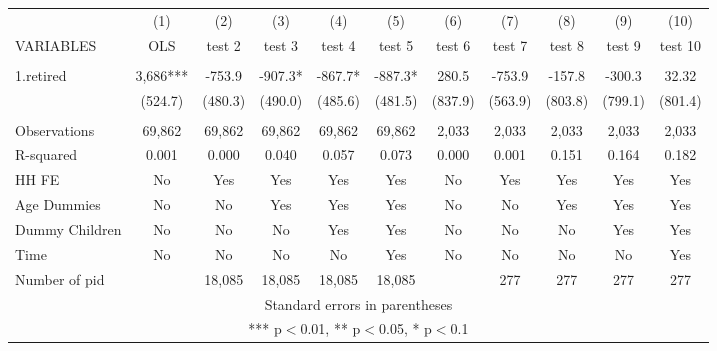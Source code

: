 \begin{tabular}{lcccccccccc} \hline
 & (1) & (2) & (3) & (4) & (5) & (6) & (7) & (8) & (9) & (10) \\
VARIABLES & OLS & test 2 & test 3 & test 4 & test 5 & test 6 & test 7 & test 8 & test 9 & test 10 \\ \hline
 &  &  &  &  &  &  &  &  &  &  \\
1.retired & 3,686*** & -753.9 & -907.3* & -867.7* & -887.3* & 280.5 & -753.9 & -157.8 & -300.3 & 32.32 \\
 & (524.7) & (480.3) & (490.0) & (485.6) & (481.5) & (837.9) & (563.9) & (803.8) & (799.1) & (801.4) \\
 &  &  &  &  &  &  &  &  &  &  \\
Observations & 69,862 & 69,862 & 69,862 & 69,862 & 69,862 & 2,033 & 2,033 & 2,033 & 2,033 & 2,033 \\
R-squared & 0.001 & 0.000 & 0.040 & 0.057 & 0.073 & 0.000 & 0.001 & 0.151 & 0.164 & 0.182 \\
HH FE & No & Yes & Yes & Yes & Yes & No & Yes & Yes & Yes & Yes \\
Age Dummies & No & No & Yes & Yes & Yes & No & No & Yes & Yes & Yes \\
Dummy Children & No & No & No & Yes & Yes & No & No & No & Yes & Yes \\
Time & No & No & No & No & Yes & No & No & No & No & Yes \\
 Number of pid &  & 18,085 & 18,085 & 18,085 & 18,085 &  & 277 & 277 & 277 & 277 \\ \hline
\multicolumn{11}{c}{ Standard errors in parentheses} \\
\multicolumn{11}{c}{ *** p$<$0.01, ** p$<$0.05, * p$<$0.1} \\
\end{tabular}

